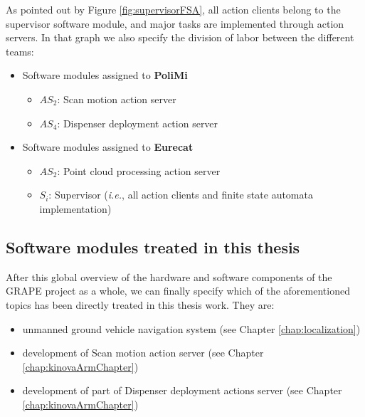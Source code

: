 

As pointed out by Figure \ref{fig:supervisorFSA}, all action clients belong to the supervisor software module, and major tasks are implemented through action servers. In that graph we also specify the division of labor between the different teams:

\begin{itemize}
	\item Software modules assigned to \textbf{PoliMi}
		\begin{itemize}
			\item $AS_2$: Scan motion action server
			\item $AS_4$:	 Dispenser deployment action server
		\end{itemize}
	\item Software modules assigned to \textbf{Eurecat}
		\begin{itemize}
			\item $AS_2$: Point cloud processing action server
			\item $S_i$:	 Supervisor (\textit{i.e.}, all action clients and finite state automata implementation)
		\end{itemize}		
\end{itemize}

\subsection{Software modules treated in this thesis}

After this global overview of the hardware and software components of the \ac{GRAPE} project as a whole, we can finally specify which of the aforementioned topics has been directly treated in this thesis work. They are:
\begin{itemize}
	\item unmanned ground vehicle navigation system (see Chapter \ref{chap:localization})
	\item development of Scan motion action server (see Chapter \ref{chap:kinovaArmChapter})
	\item development of part of Dispenser deployment actions server (see Chapter \ref{chap:kinovaArmChapter})
\end{itemize}
